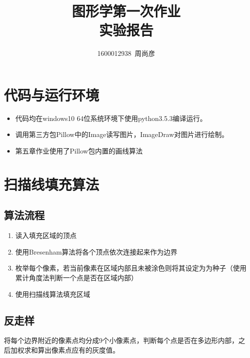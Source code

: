 \documentclass[11pt,UTF8]{article}
\title{\fontsize{25pt}{\baselineskip}\textbf{图形学第一次作业\\[2ex]实验报告}}
\author{1600012938~周尚彦}
\begin{document}
\thispagestyle{plain}

\maketitle

\tableofcontents

\setcounter{section}{0}

\section{代码与运行环境}
	\begin{itemize}
		\item 代码均在windows10 64位系统环境下使用python3.5.3编译运行。
		\item 调用第三方包Pillow中的Image读写图片，ImageDraw对图片进行绘制。
		\item 第五章作业使用了Pillow包内置的画线算法
	\end{itemize}
\newpage

\section{扫描线填充算法}
\subsection{算法流程}
	\begin{enumerate}
		\item 读入填充区域的顶点
		\item 使用Bresenham算法将各个顶点依次连接起来作为边界
		\item 枚举每个像素，若当前像素在区域内部且未被涂色则将其设定为为种子（使用累计角度法判断一个点是否在区域内部）
		\item 使用扫描线算法填充区域
	\end{enumerate}

\subsection{反走样}
	将每个边界附近的像素点均分成9个小像素点，判断每个点是否在多边形内部，之后加权求和算出像素点应有的灰度值。
\end{document}
